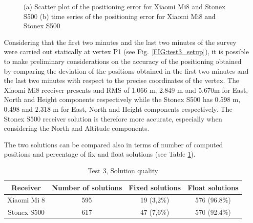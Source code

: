 \begin{figure}[H] 
	\centering
    \caption{(a) Scatter plot of the positioning error for Xiaomi Mi8 and Stonex S500  (b) time series of the positioning error for Xiaomi Mi8 and Stonex S500}
	\label{FIG:test3_pp} 
\end{figure}

Considering that the first two minutes and the last two minutes of the survey were carried out statically at vertex P1 (see Fig. \ref{FIG:test3_setup}), it is possible to make preliminary considerations on the accuracy of the positioning obtained by comparing the deviation of the positions obtained in the first two minutes and the last two minutes with respect to the precise coordinates of the vertex.
The Xiaomi Mi8 receiver presents and RMS of 1.066 m, 2.849 m and 5.670m for East, North and Height components respectively while the Stonex S500 has 0.598 m, 0.498 and 2.318 m for East, North and Height components respectively. The Stonex S500 receiver solution is therefore more accurate, especially when considering the North and Altitude components.


The two solutions can be compared also in terms of number of computed positions and percentage of fix and float solutions (see Table \ref{tab:test3_pp_quality}).

\begin{table}[H]
	\centering
	\begin{tabular}{|c|c|c|c|}
	\hline
	\textbf{Receiver} &\textbf{Number of solutions}&\textbf{Fixed solutions}&\textbf{Float solutions}\\
    \hline
	 Xiaomi Mi 8 & 595 & 19 (3,2\%) & 576 (96.8\%)\\  
    \hline
     Stonex S500 & 617 & 47 (7,6\%) & 570 (92.4\%)\\  
    \hline
	\end{tabular} 
	\caption{Test 3, Solution quality}
	\label{tab:test3_pp_quality}
\end{table}

